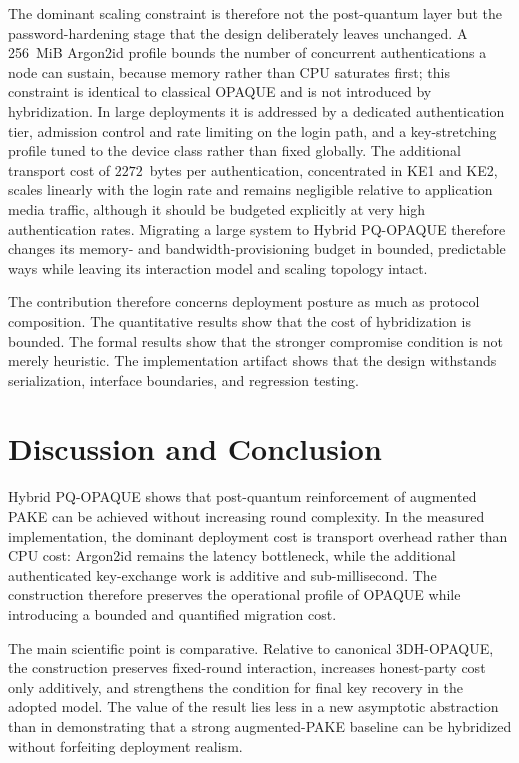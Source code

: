 \documentclass[conference]{IEEEtran}
\begin{document}
The dominant scaling constraint is therefore not the post-quantum layer but the password-hardening stage that the design deliberately leaves unchanged. A 256~MiB Argon2id profile bounds the number of concurrent authentications a node can sustain, because memory rather than CPU saturates first; this constraint is identical to classical OPAQUE and is not introduced by hybridization. In large deployments it is addressed by a dedicated authentication tier, admission control and rate limiting on the login path, and a key-stretching profile tuned to the device class rather than fixed globally. The additional transport cost of $2272$~bytes per authentication, concentrated in KE1 and KE2, scales linearly with the login rate and remains negligible relative to application media traffic, although it should be budgeted explicitly at very high authentication rates. Migrating a large system to Hybrid PQ-OPAQUE therefore changes its memory- and bandwidth-provisioning budget in bounded, predictable ways while leaving its interaction model and scaling topology intact.
\endgroup

The contribution therefore concerns deployment posture as much as protocol composition. The quantitative results show that the cost of hybridization is bounded. The formal results show that the stronger compromise condition is not merely heuristic. The implementation artifact shows that the design withstands serialization, interface boundaries, and regression testing.

\section{Discussion and Conclusion}

Hybrid PQ-OPAQUE shows that post-quantum reinforcement of augmented PAKE can be achieved without increasing round complexity. In the measured implementation, the dominant deployment cost is transport overhead rather than CPU cost: Argon2id remains the latency bottleneck, while the additional authenticated key-exchange work is additive and sub-millisecond. The construction therefore preserves the operational profile of OPAQUE while introducing a bounded and quantified migration cost.

The main scientific point is comparative. Relative to canonical 3DH-OPAQUE, the construction preserves fixed-round interaction, increases honest-party cost only additively, and strengthens the condition for final key recovery in the adopted model. The value of the result lies less in a new asymptotic abstraction than in demonstrating that a strong augmented-PAKE baseline can be hybridized without forfeiting deployment realism.
\end{document}
